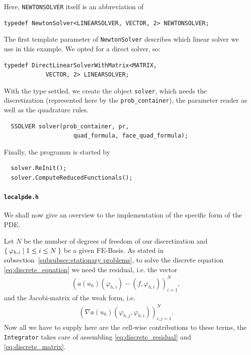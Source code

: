 \documentclass[prodmode,acmtoms]{acmsmall}
\numberwithin{equation}{section}
\renewcommand{\phi}{\varphi}
\begin{document}
Here, \texttt{NEWTONSOLVER} itself is an abbreviation of
\begin{lstlisting}
typedef NewtonSolver<LINEARSOLVER, VECTOR, 2> NEWTONSOLVER;
\end{lstlisting}
The first template parameter of \texttt{NewtonSolver} describes which linear solver we use in this example. We opted for a direct solver, so: 
\begin{lstlisting}
typedef DirectLinearSolverWithMatrix<MATRIX,
            VECTOR, 2> LINEARSOLVER;
\end{lstlisting}
With the type settled, we create the object \texttt{solver}, which needs the discretization (represented here by the \texttt{prob\_container}), the parameter reader as well as the quadrature rules.
\begin{lstlisting}
  SSOLVER solver(prob_container, pr,
                    quad_formula, face_quad_formula);
\end{lstlisting}
Finally, the programm is started by
\begin{lstlisting}
  solver.ReInit();
  solver.ComputeReducedFunctionals();
\end{lstlisting}

\paragraph{\texttt{localpde.h}}
We shall now give an overview to the implementation of the specific form of the PDE. 

Let $N$ be the number of degrees of freedom of our discretization and $\Set{\phi_{h,i}|1\leq i \leq N}$ be a given FE-Basis. As stated in subsection~\ref{subsubsec:stationary problems}, to solve the discrete equation \eqref{eq:discrete_equation} we need the residual, i.e. the vector
\begin{align}\label{eq:discrete_residual}
\left(a(u_h)(\phi_{h,i})-(f,\phi_{h,i})\right)_{i=1}^N,
\end{align}
and the Jacobi-matrix of the weak form, i.e.
\begin{align}\label{eq:discrete_matrix}
\left(\nabla a(u_h)(\phi_{h,j},\phi_{h,i})\right)_{i,j=1}^N.
\end{align}
Now all we have to supply here are the cell-wise contributions to these terms, the \texttt{Integrator} takes care of assembling \eqref{eq:discrete_residual} and \eqref{eq:discrete_matrix}.
\end{document}
